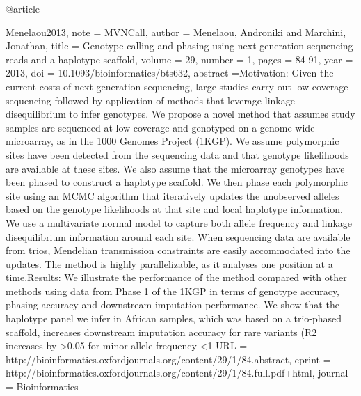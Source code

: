 @article{Menelaou2013,
note = {MVNCall},
author = {Menelaou, Androniki and Marchini, Jonathan}, 
title = {Genotype calling and phasing using next-generation sequencing reads and a haplotype scaffold},
volume = {29}, 
number = {1}, 
pages = {84-91}, 
year = {2013}, 
doi = {10.1093/bioinformatics/bts632}, 
abstract ={Motivation: Given the current costs of next-generation sequencing, large studies carry out low-coverage sequencing followed by application of methods that leverage linkage disequilibrium to infer genotypes. We propose a novel method that assumes study samples are sequenced at low coverage and genotyped on a genome-wide microarray, as in the 1000 Genomes Project (1KGP). We assume polymorphic sites have been detected from the sequencing data and that genotype likelihoods are available at these sites. We also assume that the microarray genotypes have been phased to construct a haplotype scaffold. We then phase each polymorphic site using an MCMC algorithm that iteratively updates the unobserved alleles based on the genotype likelihoods at that site and local haplotype information. We use a multivariate normal model to capture both allele frequency and linkage disequilibrium information around each site. When sequencing data are available from trios, Mendelian transmission constraints are easily accommodated into the updates. The method is highly parallelizable, as it analyses one position at a time.Results: We illustrate the performance of the method compared with other methods using data from Phase 1 of the 1KGP in terms of genotype accuracy, phasing accuracy and downstream imputation performance. We show that the haplotype panel we infer in African samples, which was based on a trio-phased scaffold, increases downstream imputation accuracy for rare variants (R2 increases by >0.05 for minor allele frequency <1%
URL = {http://bioinformatics.oxfordjournals.org/content/29/1/84.abstract}, 
eprint = {http://bioinformatics.oxfordjournals.org/content/29/1/84.full.pdf+html}, 
journal = {Bioinformatics} 
}


}
